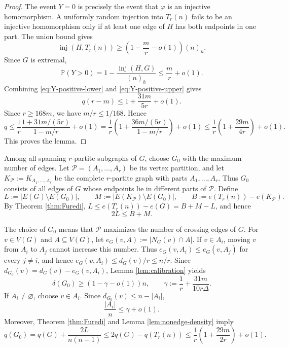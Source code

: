 \documentclass[11pt]{article}
\numberwithin{equation}{section}
\theoremstyle{definition}
\theoremstyle{remark}
\newcommand{\inj}{\operatorname{inj}}
\newcommand{\Prb}{\mathbb P}
\newcommand{\cP}{\mathcal P}
\begin{document}
\begin{proof}
The event $Y=0$ is precisely the event that $\varphi$ is an injective homomorphism. A uniformly random injection into $T_r(n)$ fails to be an injective homomorphism only if at least one edge of $H$ has both endpoints in one part. The union bound gives
\[
\inj(H,T_r(n))\ge \left(1-\frac{m}{r}-o(1)\right)(n)_h.
\]
Since $G$ is extremal,
\begin{equation}
\label{eq:Y-positive-upper}
\Prb(Y>0)=1-\frac{\inj(H,G)}{(n)_h}\le \frac{m}{r}+o(1).
\end{equation}
Combining \eqref{eq:Y-positive-lower} and \eqref{eq:Y-positive-upper} gives
\[
q(r-m)\le 1+\frac{31m}{5r}+o(1).
\]
Since $r\ge 168m$, we have $m/r\le 1/168$. Hence
\[
q\le \frac1r\frac{1+31m/(5r)}{1-m/r}+o(1)
=\frac1r\left(1+\frac{36m/(5r)}{1-m/r}\right)+o(1)
\le \frac1r\left(1+\frac{29m}{4r}\right)+o(1).
\]
This proves the lemma.
\end{proof}

Among all spanning $r$-partite subgraphs of $G$, choose $G_0$ with the maximum number of edges. Let $\cP=(A_1,\ldots,A_r)$ be its vertex partition, and let $K_{\cP}:=K_{A_1,\ldots,A_r}$ be the complete $r$-partite graph with parts $A_1,\ldots,A_r$. Thus $G_0$ consists of all edges of $G$ whose endpoints lie in different parts of $\cP$. Define
\[
L:=|E(G)\setminus E(G_0)|,\qquad
M:=|E(K_{\cP})\setminus E(G_0)|,
\qquad
B:=e(T_r(n))-e(K_{\cP}).
\]
By Theorem \ref{thm:Furedi}, $L\le e(T_r(n))-e(G)=B+M-L$, and hence
\begin{equation}
\label{eq:Furedi-assembly}
2L\le B+M.
\end{equation}

The choice of $G_0$ means that $\cP$ maximizes the number of crossing edges of $G$. For $v\in V(G)$ and $A\subseteq V(G)$, let $e_G(v,A):=|N_G(v)\cap A|$. If $v\in A_i$, moving $v$ from $A_i$ to $A_j$ cannot increase this number. Thus $e_G(v,A_i)\le e_G(v,A_j)$ for every $j\ne i$, and hence $e_G(v,A_i)\le d_G(v)/r\le n/r$. Since $d_{G_0}(v)=d_G(v)-e_G(v,A_i)$, Lemma \ref{lem:calibration} yields
\begin{equation}
\label{eq:G0-min-degree}
\delta(G_0)\ge (1-\gamma-o(1))n,
\qquad
\gamma:=\frac1r+\frac{31m}{10r\Delta}.
\end{equation}
If $A_i\ne\varnothing$, choose $v\in A_i$. Since $d_{G_0}(v)\le n-|A_i|$,
\begin{equation}
\label{eq:part-size-upper}
\frac{|A_i|}{n}\le \gamma+o(1).
\end{equation}
Moreover, Theorem \ref{thm:Furedi} and Lemma \ref{lem:nonedge-density} imply
\begin{equation}
q(G_0)=q(G)+\frac{2L}{n(n-1)}\le 2q(G)-q(T_r(n))\le \frac1r\left(1+\frac{29m}{2r}\right)+o(1).
\label{eq:G0-nonedge-density}
\end{equation}
\end{document}
